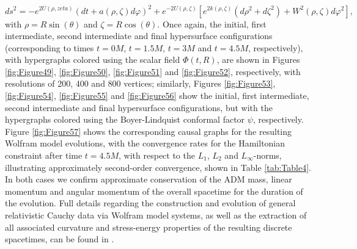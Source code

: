 \documentclass{article}
\begin{document}
\begin{equation}
d s^2 = - e^{2 U \left( \rho, zeta \right)} \left( d t  + a \left( \rho, \zeta \right) d \varphi \right)^2 + e^{-2 U \left( \rho, \zeta \right)} \left[ e^{2 k \left( \rho, \zeta \right)} \left( d \rho^2 + d \zeta^2 \right) + W^2 \left(\rho, \zeta \right) d \varphi^2 \right],
\end{equation}
with ${\rho = R \sin \left( \theta \right)}$ and ${\zeta = R \cos \left( \theta \right)}$. Once again, the initial, first intermediate, second intermediate and final hypersurface configurations (corresponding to times ${t = 0M}$, ${t = 1.5 M}$, ${t = 3M}$ and ${t = 4.5 M}$, respectively), with hypergraphs colored using the scalar field ${\Phi \left( t, R \right)}$, are shown in Figures \ref{fig:Figure49}, \ref{fig:Figure50}, \ref{fig:Figure51} and \ref{fig:Figure52}, respectively, with resolutions of 200, 400 and 800 vertices; similarly, Figures \ref{fig:Figure53}, \ref{fig:Figure54}, \ref{fig:Figure55} and \ref{fig:Figure56} show the initial, first intermediate, second intermediate and final hypersurface configurations, but with the hypergraphs colored using the Boyer-Lindquist conformal factor ${\psi}$, respectively. Figure \ref{fig:Figure57} shows the corresponding causal graphs for the resulting Wolfram model evolutions, with the convergence rates for the Hamiltonian constraint after time ${t = 4.5 M}$, with respect to the ${L_1}$, ${L_2}$ and ${L_{\infty}}$-norms, illustrating approximately second-order convergence, shown in Table \ref{tab:Table4}. In both cases we confirm approximate conservation of the ADM mass, linear momentum and angular momentum of the overall spacetime for the duration of the evolution. Full details regarding the construction and evolution of general relativistic Cauchy data via Wolfram model systems, as well as the extraction of all associated curvature and stress-energy properties of the resulting discrete spacetimes, can be found in \cite{gorard4}.
\end{document}

